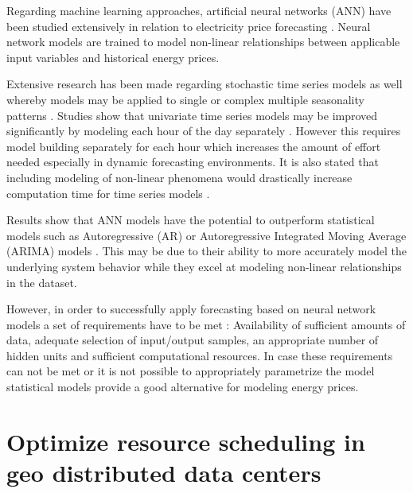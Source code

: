 Regarding machine learning approaches, artificial neural networks (ANN) have been studied extensively in relation to electricity price forecasting \cite{vahidinasab2008day, singhal2011electricity, pao2007forecasting, amjady2006day, catalao2007short, 
gareta2006forecasting, duanelectricity, szkuta1999electricity}. Neural network models are trained to model non-linear relationships between applicable input variables and historical energy prices. 

Extensive research has been made regarding stochastic time series models as well whereby models may be applied to single \cite{garcia2005garch, weron2008forecastingWh, weron2008forecasting, nogales2002forecasting, cuaresma2004forecasting, tan2010day, conejo2005day} or complex multiple seasonality patterns \cite{de2011forecasting, gould2008forecasting, zivot2003vector}. 
Studies show that univariate time series models may be improved significantly by modeling each hour of the day separately \cite{cuaresma2004forecasting, weron2008forecasting}. However this requires model building separately for each hour which increases the amount of effort needed especially in dynamic forecasting environments. 
It is also stated that including modeling of non-linear phenomena would drastically increase computation time for time series models \cite{cuaresma2004forecasting}. 


Results show that ANN models have the potential to outperform statistical models such as Autoregressive (AR) or Autoregressive Integrated Moving Average (ARIMA) models \cite{pao2007forecasting, catalao2007short}. This may be due to their ability to more accurately model the underlying system behavior while they excel at modeling non-linear relationships in the dataset. 

However, in order to successfully apply forecasting based on neural network models a set of requirements have to be met \cite{catalao2007short}: Availability of sufficient amounts of data, adequate selection of input/output samples, an appropriate number of hidden units and sufficient computational resources. In case these requirements can not be met or it is not possible to appropriately parametrize the model statistical models provide a good alternative for modeling energy prices. 




\section{Optimize resource scheduling in geo distributed data centers}

